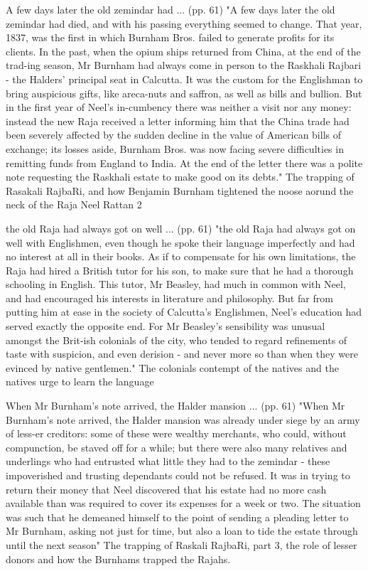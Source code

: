A few days later the old zemindar had ... (pp. 61)
"A few days later the old zemindar had died, and with his passing everything seemed to change. That year, 1837, was the first in which Burnham Bros. failed to generate profits for its clients. In the past, when the opium ships returned from China, at the end of the trad-ing season, Mr Burnham had always come in person to the Raskhali Rajbari - the Halders’ principal seat in Calcutta. It was the custom for the Englishman to bring auspicious gifts, like areca-nuts and saffron, as well as bills and bullion. But in the first year of Neel’s in-cumbency there was neither a visit nor any money: instead the new Raja received a letter informing him that the China trade had been severely affected by the sudden decline in the value of American bills of exchange; its losses aside, Burnham Bros. was now facing severe difficulties in remitting funds from England to India. At the end of the letter there was a polite note requesting the Raskhali estate to make good on its debts."
The trapping of Rasakali RajbaRi, and how Benjamin Burnham tightened the noose aorund the neck of the Raja Neel Rattan 2

the old Raja had always got on well ... (pp. 61)
"the old Raja had always got on well with Englishmen, even though he spoke their language imperfectly and had no interest at all in their books. As if to compensate for his own limitations, the Raja had hired a British tutor for his son, to make sure that he had a thorough schooling in English. This tutor, Mr Beasley, had much in common with Neel, and had encouraged his interests in literature and philosophy. But far from putting him at ease in the society of Calcutta’s Englishmen, Neel’s education had served exactly the opposite end. For Mr Beasley’s sensibility was unusual amongst the Brit-ish colonials of the city, who tended to regard refinements of taste with suspicion, and even derision - and never more so than when they were evinced by native gentlemen."
The colonials contempt of the natives and the natives urge to learn the language

When Mr Burnham’s note arrived, the Halder mansion ... (pp. 61)
"When Mr Burnham’s note arrived, the Halder mansion was already under siege by an army of less-er creditors: some of these were wealthy merchants, who could, without compunction, be staved off for a while; but there were also many relatives and underlings who had entrusted what little they had to the zemindar - these impoverished and trusting dependants could not be refused. It was in trying to return their money that Neel discovered that his estate had no more cash available than was required to cover its expenses for a week or two. The situation was such that he demeaned himself to the point of sending a pleading letter to Mr Burnham, asking not just for time, but also a loan to tide the estate through until the next season"
The trapping of Raskali RajbaRi, part 3, the role of lesser donors and how the Burnhams trapped the Rajahs.

